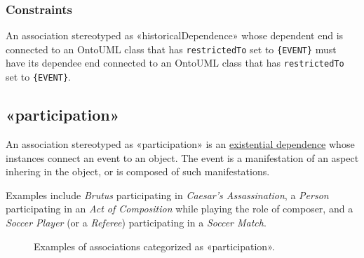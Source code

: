 \subsubsection{Constraints}

\begin{constraint}
\label{constraint:historicalDependenceEventDependentRequiresEventDependee}
An association stereotyped as «historicalDependence» whose dependent end is connected to an OntoUML class that has \texttt{restrictedTo} set to \texttt{\{EVENT\}} must have its dependee end connected to an OntoUML class that has \texttt{restrictedTo} set to \texttt{\{EVENT\}}.

\end{constraint}

\subsection{«participation»}
\label{stereotype:participation}

An association stereotyped as «participation» is an \hyperref[stereotype:existential-dependence]{existential dependence} whose instances connect an event to an object. The event is a manifestation of an aspect inhering in the object, or is composed of such manifestations.

Examples include \textit{Brutus} participating in \textit{Caesar's Assassination}, a \textit{Person} participating in an \textit{Act of Composition} while playing the role of composer, and a \textit{Soccer Player} (or a \textit{Referee}) participating in a \textit{Soccer Match}.

\begin{figure}[h]
    \centering
    
    \caption{Examples of associations categorized as «participation».}
    \label{fig:participation-example}
\end{figure}

